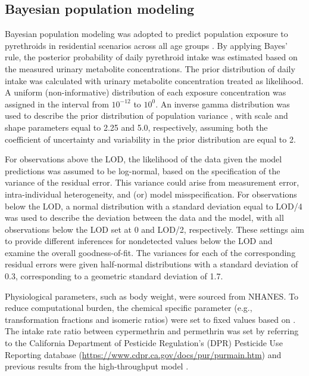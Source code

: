 \documentclass[toxics,article,submit,pdftex,moreauthors]{Definitions/mdpi}
\begin{document}
\subsection{Bayesian population
modeling}\label{bayesian-population-modeling}

Bayesian population modeling was adopted to predict population exposure
to pyrethroids in residential scenarios across all age groups
\citep{allen2007use, lyons2008computational}. By applying Bayes' rule,
the posterior probability of daily pyrethroid intake was estimated based
on the measured urinary metabolite concentrations. The prior
distribution of daily intake was calculated with urinary metabolite
concentration treated as likelihood. A uniform (non-informative)
distribution of each exposure concentration was assigned in the interval
from \(10^{-12}\) to \(10^0\). An inverse gamma distribution was used to
describe the prior distribution of population variance
\citep{lyons2008computational}, with scale and shape parameters equal to
2.25 and 5.0, respectively, assuming both the coefficient of uncertainty
and variability in the prior distribution are equal to 2.

For observations above the LOD, the likelihood of the data given the
model predictions was assumed to be log-normal, based on the
specification of the variance of the residual error. This variance could
arise from measurement error, intra-individual heterogeneity, and (or)
model misspecification. For observations below the LOD, a normal
distribution with a standard deviation equal to LOD/4 was used to
describe the deviation between the data and the model, with all
observations below the LOD set at 0 and LOD/2, respectively. These
settings aim to provide different inferences for nondetected values
below the LOD and examine the overall goodness-of-fit. The variances for
each of the corresponding residual errors were given half-normal
distributions with a standard deviation of 0.3, corresponding to a
geometric standard deviation of 1.7.

Physiological parameters, such as body weight, were sourced from NHANES.
To reduce computational burden, the chemical specific parameter (e.g.,
transformation fractions and isomeric ratios) were set to fixed values
based on \citet{quindroit2019estimating}. The intake rate ratio between
cypermethrin and permethrin was set by referring to the California
Department of Pesticide Regulation's (DPR) Pesticide Use Reporting
database (\url{https://www.cdpr.ca.gov/docs/pur/purmain.htm}) and
previous results from the high-throughput model
\citep{stanfield2022bayesian}.
\end{document}
